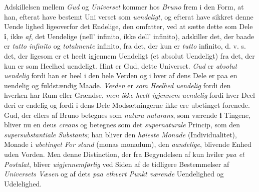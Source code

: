 Adskillelsen mellem \emph{Gud} og \emph{Universet} kommer hos
\emph{Bruno} frem i den Form, at han, efterat have bestemt Uni\-%
verset som \emph{uendeligt}, og efterat have sikkret denne Uende\-%
lighed ligeoverfor det Endelige, den omfatter, ved at sætte
dette som Dele \textbf{i}, ikke \emph{af}, det Uendelige (nell' infinito, ikke
dell' infinito), adskiller det, der baade er \emph{tutto infinito} og
\emph{totalmente} infinito, fra det, der kun er \emph{tutto} infinito,
d. v. s. det, der ligesom er et heelt igjennem Uendeligt (et
absolut Uendeligt) fra det, der kun er som Heelhed uendeligt.
Hint er Gud, dette Universet. \emph{Gud} er \emph{absolut uendelig}
fordi han er heel i den hele Verden og i hver af dens Dele
er paa en uendelig og fuldstændig Maade. \emph{Verden} er \emph{som
Heelhed uendelig} fordi den hverken har Rum eller Grændse,
\emph{men ikke heelt igjennem uendelig} fordi hver Deel deri
er endelig og fordi i dens Dele Modsætningerne ikke ere
ubetinget forenede. Gud, der ellers af Bruno betegnes som
\emph{natura naturans}, som værende \textbf{i} Tingene, bliver nu en
deus \emph{creans} og betegnes som det \emph{supernaturale} Princip,
som den \emph{supersubstantiale Substants}; han bliver den
\emph{høieste Monade} (Individualitet), Monade i \emph{ubetinget For\-%
stand} (monas monadum), den \emph{aandelige}, blivende Enhed
uden Vorden. Men denne Distinction, der fra Begyndelsen af
kun hviler \emph{paa et Postulat}, bliver \emph{uigjennemførlig} ved
Siden af de tidligere Bestemmelser af \emph{Universets Væsen}
og af dets \emph{paa ethvert Punkt værende} Uendelighed og
Udelelighed.

